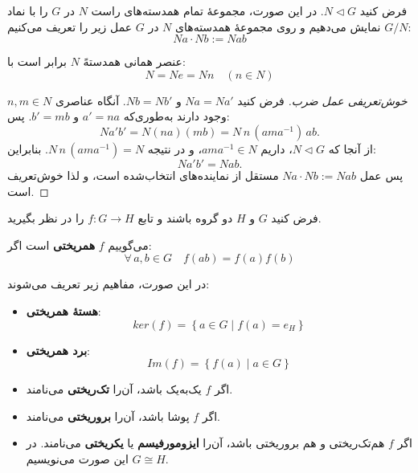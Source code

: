 \begin{frame}
    \begin{definition}
        فرض کنید $N \triangleleft G$. در این صورت، مجموعهٔ تمام همدسته‌های راست $N$ در $G$ را با نماد $G / N$ نمایش می‌دهیم و روی مجموعهٔ همدسته‌های $N$ در $G$ عمل زیر را تعریف می‌کنیم:
        \[
            Na \cdot Nb := Nab
        \]

        عنصر همانی همدستهً $N$ برابر است با:
        \[
            N = Ne = Nn \quad (n \in N)
        \]
    \end{definition}

    \begin{proof}[خوش‌تعریفی عمل ضرب]
        فرض کنید \(Na = Na'\) و \(Nb = Nb'\). آنگاه عناصری \(n, m \in N\) وجود دارند به‌طوری‌که
        \(a' = na\) و \(b' = mb\). پس:
        \[
            Na'b' = N(na)(mb) = N\,n\,(a m a^{-1})\,ab.
        \]
        از آنجا که \(N \triangleleft G\)، داریم \(a m a^{-1} \in N\)، و در نتیجه
        \(N\,n\,(a m a^{-1}) = N\). بنابراین:
        \[
            Na'b' = N ab.
        \]
        پس عمل \(Na \cdot Nb := Nab\) مستقل از نماینده‌های انتخاب‌شده است،
        و لذا خوش‌تعریف است.
    \end{proof}


\end{frame}


\begin{frame}
    \footnotesize
    \begin{definition}[همریختی ]
        فرض کنید $G$ و $H$ دو گروه باشند و تابع $f \colon G \to H$ را در نظر بگیرید.

        می‌گوییم $f$ \textbf{همریختی} است اگر:
        \[
            \forall\, a,b \in G \quad f(ab) = f(a)f(b)
        \]

        در این صورت، مفاهیم زیر تعریف می‌شوند:

        \begin{itemize}
            \item \textbf{هستهٔ همریختی}:
                  \[
                      ker (f) = \left\{ a \in G \mid f(a) = e_H \right\}
                  \]

            \item \textbf{برد همریختی}:
                  \[
                      Im (f) = \left\{ f(a) \mid a \in G \right\}
                  \]

            \item اگر $f$ یک‌به‌یک باشد، آن‌را \textbf{تک‌ریختی}  می‌نامند.

            \item اگر $f$ پوشا باشد، آن‌را \textbf{برو‌ریختی}  می‌نامند.

            \item اگر $f$ هم‌تک‌ریختی و هم برو‌ریختی باشد، آن‌را \textbf{ایزومورفیسم} یا \textbf{یکریختی}  می‌نامند. در این صورت می‌نویسیم $G \cong H$.

        \end{itemize}
    \end{definition}
\end{frame}


